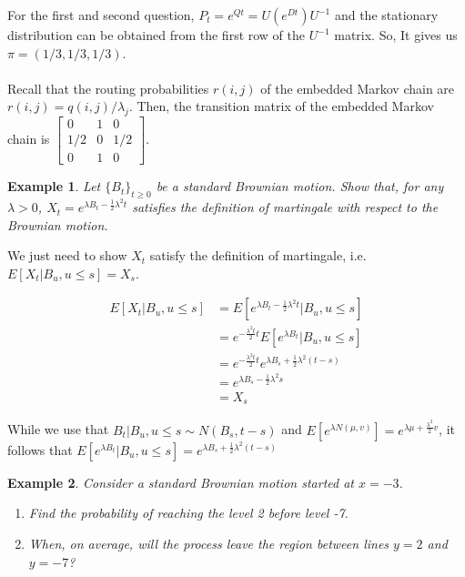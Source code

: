 \documentclass[12pt]{article}
\newtheorem{example}{Example}
\begin{document}
\noindent For the first and second question, $P_t = e^{Qt} = U(e^{Dt})U^{-1}$ and the stationary distribution can be obtained from the first row of the $U^{-1}$ matrix. So, It gives us $\pi = (1/3, 1/3, 1/3)$.
\\
\\Recall that the routing probabilities $r(i,j)$ of the embedded Markov chain are $r(i,j) = q(i,j)/\lambda_j$. Then, the transition matrix of the embedded Markov chain is
$\begin{bmatrix}
     0 & 1 & 0\\
     1/2 & 0 & 1/2\\
     0 & 1 & 0
\end{bmatrix}$.

\begin{example}
    Let $\{B_t\}_{t \geq 0}$ be a standard Brownian motion. Show that, for any $\lambda > 0$, $X_t = e^{\lambda B_t - \frac{1}{2}\lambda ^2 t}$ satisfies the definition of martingale with respect to the Brownian motion.
\end{example}

\noindent We just need to show $X_t$ satisfy the definition of martingale, i.e. $E[X_t | B_u, u \leq s] = X_s$.
\begin{center}
    \begin{align*}
        E[X_t| B_u, u \leq s] & = E[e^{\lambda B_t - \frac{1}{2}\lambda ^2 t} | B_u, u \leq s] \\
        & = e^{-\frac{\lambda^2 t}{2}t} E[e^{\lambda B_t} | B_u, u \leq s] \\
        & = e^{-\frac{\lambda^2 t}{2}t} e^{\lambda B_s + \frac{1}{2}\lambda ^2 (t - s)} \\
        & = e^{\lambda B_s - \frac{1}{2}\lambda ^2 s} \\
        & = X_s
    \end{align*}
\end{center}
While we use that $B_t | B_u, u \leq s \sim N(B_s, t - s)$ and $E[e^{\lambda N(\mu,v)}] = e^{\lambda \mu + \frac{\lambda ^2}{2}v}$, it follows that $E[e^{\lambda B_t} | B_u, u \leq s] = e^{\lambda B_s + \frac{1}{2}\lambda ^2 (t - s)}$

\begin{example}
    Consider a standard Brownian motion started at $x = -3$.
    \begin{enumerate}
        \item Find the probability of reaching the level 2 before level -7.
        \item When, on average, will the process leave the region between lines $y = 2$ and $y = -7$?
    \end{enumerate}
\end{example}
\end{document}
